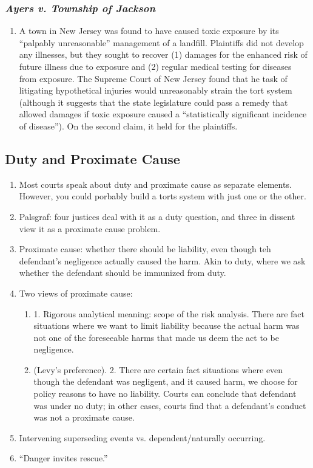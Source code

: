 \subsubsection{\emph{Ayers v. Township of Jackson}}

\begin{enumerate}
    \item A town in New Jersey was found to have caused toxic exposure by its ``palpably unreasonable'' management of a landfill. Plaintiffs did not develop any illnesses, but they sought to recover (1) damages for the enhanced risk of future illness due to exposure and (2) regular medical testing for diseases from exposure. The Supreme Court of New Jersey found that he task of litigating hypothetical injuries would unreasonably strain the tort system (although it suggests that the state legislature could pass a remedy that allowed damages if toxic exposure caused a ``statistically significant incidence of disease''). On the second claim, it held for the plaintiffs.
\end{enumerate}

\subsection{Duty and Proximate Cause}

\begin{enumerate}
    \item Most courts speak about duty and proximate cause as separate elements. However, you could porbably build a torts system with just one or the other.
    \item Palsgraf: four justices deal with it as a duty question, and three in dissent view it as a proximate cause problem.
    \item Proximate cause: whether there should be liability, even though teh defendant's negligence actually caused the harm. Akin to duty, where we ask whether the defendant should be immunized from duty.
    \item Two views of proximate cause:
    \begin{enumerate}
        \item 1. Rigorous analytical meaning: scope of the risk analysis. There are fact situations where we want to limit liability because the actual harm was not one of the foreseeable harms that made us deem the act to be negligence. 
        \item (Levy's preference). 2. There are certain fact situations where even though the defendant was negligent, and it caused harm, we choose for policy reasons to have no liability. Courts can conclude that defendant was under no duty; in other cases, courts find that a defendant's conduct was not a proximate cause.
    \end{enumerate}
    \item Intervening superseding events vs. dependent/naturally occurring.
    \item ``Danger invites rescue.''
\end{enumerate}

